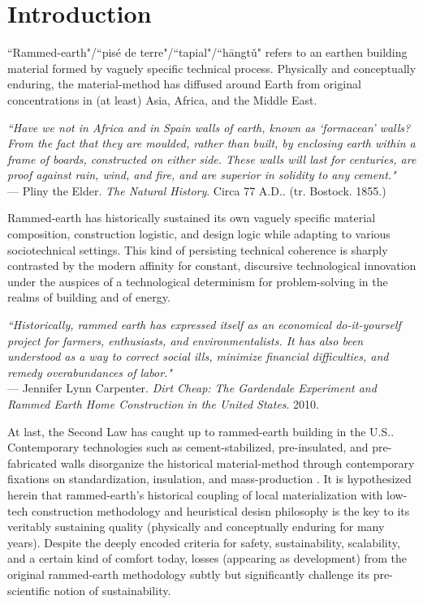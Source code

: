 \section{Introduction}


``Rammed-earth"/``pis\'e de terre"/``tapial"/``h\=angt\v u" refers to an earthen building material formed by vaguely specific technical process. Physically and conceptually enduring, the material-method has diffused around Earth from original concentrations in (at least) Asia, Africa, and the Middle East. \cite{RAMMEDEARTHHOUSE}

\begin{flushright}
\small{
\textit{``Have we not in Africa and in Spain walls of earth, known as `formacean' walls? From the fact that they are moulded, rather than built, by enclosing earth within a frame of boards, constructed on either side. These walls will last for centuries, are proof against rain, wind, and fire, and are superior in solidity to any cement."}}\\ --- Pliny the Elder. \textit{The Natural History}. Circa 77 A.D.. (tr. Bostock. 1855.)
\end{flushright}

Rammed-earth has historically sustained its own vaguely specific material composition, construction logistic, and design logic while adapting to various sociotechnical settings. This kind of persisting technical coherence is sharply contrasted by the modern affinity for constant, discursive technological innovation under the auspices of a technological determinism for problem-solving in the realms of building and of energy. 

\begin{flushright}
\small{
\textit{
``Historically, rammed earth has expressed itself as an economical do-it-yourself project for farmers, enthusiasts, and environmentalists. It has also been understood as a way to correct social ills, minimize financial difficulties, and remedy overabundances of labor."}}\\ --- Jennifer Lynn Carpenter. \textit{Dirt Cheap: The Gardendale Experiment and Rammed Earth Home Construction in the United States}. 2010.
\end{flushright}

At last, the Second Law has caught up to rammed-earth building in the U.S.. Contemporary technologies such as cement-stabilized, pre-insulated, and pre-fabricated walls disorganize the historical material-method through contemporary fixations on standardization, insulation, and mass-production \cite{MOECONVERGENCE}. It is hypothesized herein that rammed-earth's historical coupling of local materialization with low-tech construction methodology and heuristical desisn philosophy is the key to its veritably sustaining quality (physically and conceptually enduring for many years). Despite the deeply encoded criteria for safety, sustainability, scalability, and a certain kind of comfort today, losses (appearing as development) from the original rammed-earth methodology subtly but significantly challenge its pre-scientific notion of sustainability.

